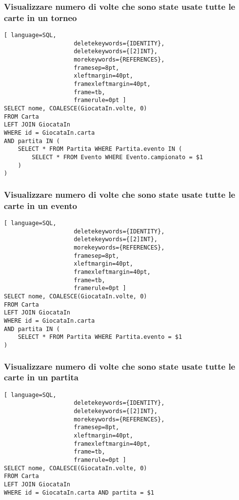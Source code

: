 \documentclass{article}
\begin{document}
\subsubsection{Visualizzare numero di volte che sono state usate tutte le carte in un torneo}
\begin{lstlisting}[ language=SQL,
                    deletekeywords={IDENTITY},
                    deletekeywords={[2]INT},
                    morekeywords={REFERENCES},
                    framesep=8pt,
                    xleftmargin=40pt,
                    framexleftmargin=40pt,
                    frame=tb,
                    framerule=0pt ]
SELECT nome, COALESCE(GiocataIn.volte, 0)
FROM Carta
LEFT JOIN GiocataIn
WHERE id = GiocataIn.carta 
AND partita IN (
    SELECT * FROM Partita WHERE Partita.evento IN (
        SELECT * FROM Evento WHERE Evento.campionato = $1
    )
)
\end{lstlisting}

\subsubsection{Visualizzare numero di volte che sono state usate tutte le carte in un evento}
\begin{lstlisting}[ language=SQL,
                    deletekeywords={IDENTITY},
                    deletekeywords={[2]INT},
                    morekeywords={REFERENCES},
                    framesep=8pt,
                    xleftmargin=40pt,
                    framexleftmargin=40pt,
                    frame=tb,
                    framerule=0pt ]
SELECT nome, COALESCE(GiocataIn.volte, 0)
FROM Carta
LEFT JOIN GiocataIn
WHERE id = GiocataIn.carta 
AND partita IN (
    SELECT * FROM Partita WHERE Partita.evento = $1
)
\end{lstlisting}

\subsubsection{Visualizzare numero di volte che sono state usate tutte le carte in un partita}
\begin{lstlisting}[ language=SQL,
                    deletekeywords={IDENTITY},
                    deletekeywords={[2]INT},
                    morekeywords={REFERENCES},
                    framesep=8pt,
                    xleftmargin=40pt,
                    framexleftmargin=40pt,
                    frame=tb,
                    framerule=0pt ]
SELECT nome, COALESCE(GiocataIn.volte, 0)
FROM Carta
LEFT JOIN GiocataIn
WHERE id = GiocataIn.carta AND partita = $1
\end{lstlisting}
\end{document}
